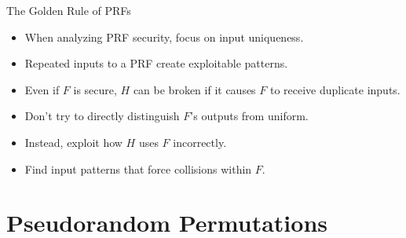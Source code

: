 \documentclass[aspectratio=169, lualatex, handout]{beamer}
\begin{document}
\begin{frame}{The Golden Rule of PRFs}
	\begin{itemize}[<+->]
		\item When analyzing PRF security, focus on input uniqueness.
		\item Repeated inputs to a PRF create exploitable patterns.
		\item Even if $F$ is secure, $H$ can be broken if it causes $F$ to receive duplicate inputs.
		\item Don't try to directly distinguish $F$'s outputs from uniform.
		\item Instead, exploit how $H$ uses $F$ incorrectly.
		\item Find input patterns that force collisions within $F$.
	\end{itemize}
\end{frame}

\section{Pseudorandom Permutations}
\end{document}
